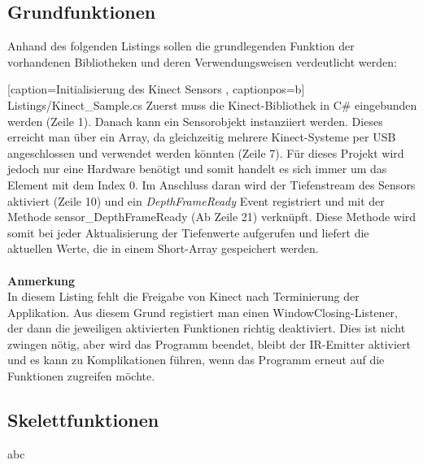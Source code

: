 \subsection{Grundfunktionen}
Anhand des folgenden Listings sollen die grundlegenden Funktion der vorhandenen Bibliotheken und deren Verwendungsweisen verdeutlicht werden:


    [caption={Initialisierung des Kinect Sensors \cite{pdf:maccormick}}
       \label{lst:kinect_sdk},
       captionpos=b]
 {Listings/Kinect_Sample.cs}
\noindent
Zuerst muss die Kinect-Bibliothek in C\# eingebunden werden (Zeile 1). Danach kann ein Sensorobjekt instanziiert werden. Dieses erreicht man über ein Array, da gleichzeitig mehrere Kinect-Systeme per USB angeschlossen und verwendet werden könnten (Zeile 7). Für dieses Projekt wird jedoch nur eine Hardware benötigt und somit handelt es sich immer um das Element mit dem Index 0. Im Anschluss daran wird der Tiefenstream des Sensors aktiviert (Zeile 10) und ein \textit{DepthFrameReady} Event registriert und mit der Methode sensor\_DepthFrameReady (Ab Zeile 21) verknüpft. Diese Methode wird somit bei jeder Aktualisierung der Tiefenwerte aufgerufen und liefert die aktuellen Werte, die in einem Short-Array gespeichert werden. \\ \\
\textbf{Anmerkung}\\
In diesem Listing fehlt die Freigabe von Kinect nach Terminierung der Applikation. Aus diesem Grund
registiert man einen WindowClosing-Listener, der dann die jeweiligen aktivierten Funktionen richtig deaktiviert. Dies ist nicht zwingen nötig, aber wird das Programm beendet, bleibt der IR-Emitter aktiviert und es kann zu Komplikationen führen, wenn das Programm erneut auf die Funktionen zugreifen möchte.

\subsection{Skelettfunktionen}
abc

%

